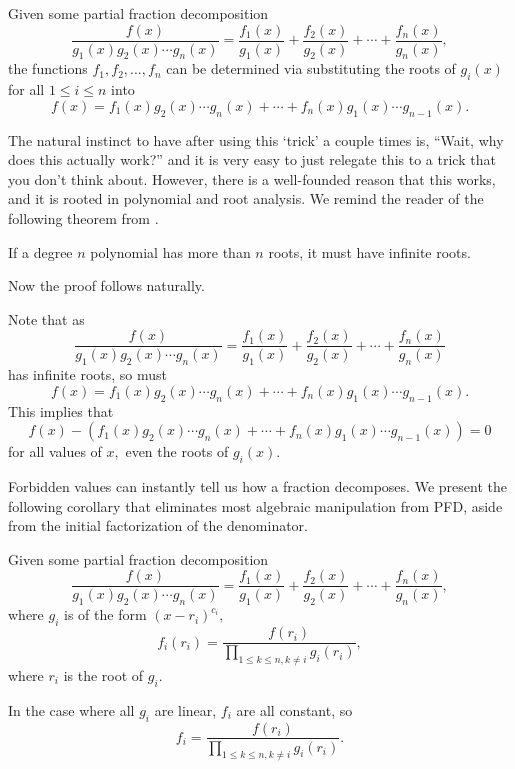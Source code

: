 \documentclass{article}
\begin{document}
\begin{theo}
Given some partial fraction decomposition
\[\frac{f(x)}{g_1(x)g_2(x)\cdots g_n(x)}=\frac{f_1(x)}{g_1(x)}+\frac{f_2(x)}{g_2(x)}+\cdots+\frac{f_n(x)}{g_n(x)},\]
the functions $f_1,f_2,\ldots, f_n$ can be determined via substituting the roots of $g_i(x)$ for all $1\leq i\leq n$ into
\[f(x)=f_1(x)g_2(x)\cdots g_n(x)+\cdots+f_n(x)g_1(x)\cdots g_{n-1}(x).\]
\end{theo}

The natural instinct to have after using this `trick' a couple times is, ``Wait, why does this actually work?'' and it is very easy to just relegate this to a trick that you don't think about. However, there is a well-founded reason that this works, and it is rooted in polynomial and root analysis. We remind the reader of the following theorem from .

\begin{theo}
If a degree $n$ polynomial has more than $n$ roots, it must have infinite roots.
\end{theo}

Now the proof follows naturally.

\begin{pro}
Note that as
\[\frac{f(x)}{g_1(x)g_2(x)\cdots g_n(x)}=\frac{f_1(x)}{g_1(x)}+\frac{f_2(x)}{g_2(x)}+\cdots+\frac{f_n(x)}{g_n(x)}\]
has infinite roots, so must 
\[f(x)=f_1(x)g_2(x)\cdots g_n(x)+\cdots+f_n(x)g_1(x)\cdots g_{n-1}(x).\]
This implies that
\[f(x)-(f_1(x)g_2(x)\cdots g_n(x)+\cdots+f_n(x)g_1(x)\cdots g_{n-1}(x))=0\]
for all values of $x,$ even the roots of $g_i(x).$
\end{pro}

Forbidden values can instantly tell us how a fraction decomposes. We present the following corollary that eliminates most algebraic manipulation from PFD, aside from the initial factorization of the denominator.

\begin{theo}
Given some partial fraction decomposition
\[\frac{f(x)}{g_1(x)g_2(x)\cdots g_n(x)}=\frac{f_1(x)}{g_1(x)}+\frac{f_2(x)}{g_2(x)}+\cdots+\frac{f_n(x)}{g_n(x)},\] where $g_i$ is of the form $(x-r_i)^{c_i},$
\[f_i(r_i)=\frac{f(r_i)}{\prod\limits_{1\leq k\leq n, k\neq i}g_i(r_i)},\] where $r_i$ is the root of $g_i.$

In the case where all $g_i$ are linear, $f_i$ are all constant, so \[f_i=\frac{f(r_i)}{\prod\limits_{1\leq k\leq n,k\neq i}g_i(r_i)}.\]
\end{theo}
\end{document}
